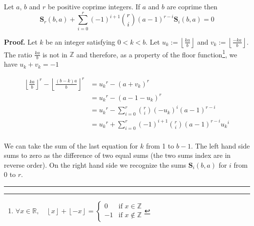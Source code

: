 \documentclass[10pt,a4paper]{amsart}
\newcommand{\ENT}[1]{ \left\lfloor #1 \right\rfloor}
\newcommand{\SUMS}[3]{\mathbf{S}_{#1}\left(#2,#3\right)}
\newenvironment{proof}[1][Proof]{\textbf{#1.} }{\ \rule{0.5em}{0.5em}}
\begin{document}
\begin{proposition}\label{prop:rel_Srba_Siba} Let $a$, $b$ and $r$ be positive coprime integers. If $a$ and $b$ are coprime then
\begin{equation}
\SUMS{r}{b}{a}+\sum_{i=0}^r(-1)^{i+1}\binom{r}{i}(a-1)^{r-i}\SUMS{i}{b}{a}=0
\label{eq:rel_Srba_Siba}
\end{equation} 
\end{proposition}

\begin{proof}
Let $k$ be an integer satisfying $0<k<b$. Let $u_k:=\ENT{\frac{ka}{b}}$ and $v_k:=\ENT{\frac{-ka}{b}}$. The ratio $\frac{ka}{b}$ is not in $\mathbb{Z}$ and therefore, as a property of the floor function\footnote{$\forall x \in \mathbb{R}, \quad \left\lfloor x\right\rfloor + \left\lfloor -x \right\rfloor = 
\left\{
    \begin{array}{ll}
				0  & \mbox{if  } x\in\mathbb{Z} \\
        -1 & \mbox{if  } x\notin\mathbb{Z}
    \end{array}
\right.$}, we have $u_k+v_k=-1$

\begin{align*}
\ENT{\frac{ka}{b}}^r-\ENT{\frac{(b-k)a}{b}}^r
&= {u_k}^r-(a+v_k)^r \\
&= {u_k}^r-(a-1-u_k)^r \\
&= {u_k}^r-\sum_{i=0}^r\binom{r}{i}(-u_k)^i(a-1)^{r-i} \\
&= {u_k}^r+\sum_{i=0}^r(-1)^{i+1}\binom{r}{i}(a-1)^{r-i}{u_k}^i \\
\end{align*}

We can take the sum of the last equation for $k$ from 1 to $b-1$. The left hand side sums to zero as the difference of two equal sums (the two sums index are in reverse order). On the right hand side we recognize the sums $\SUMS{i}{b}{a}$ for $i$ from 0 to $r$.
\end{proof}
\end{document}
